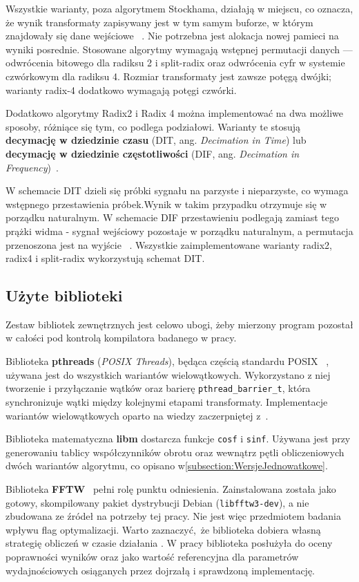 Wszystkie warianty, poza algorytmem Stockhama, działają w miejscu, co oznacza, że wynik transformaty zapisywany jest w tym
samym buforze, w którym znajdowały się dane wejściowe ~\cite{ZielinskiDSP}. Nie potrzebna jest alokacja nowej pamieci na wyniki posrednie. Stosowane algorytmy wymagają
wstępnej permutacji danych — odwrócenia bitowego dla radiksu 2 i split-radix
oraz odwrócenia cyfr w systemie czwórkowym dla radiksu 4. Rozmiar transformaty
jest zawsze potęgą dwójki; warianty radix-4 dodatkowo wymagają potęgi czwórki.

Dodatkowo algorytmy Radix2 i Radix 4 można implementować na dwa możliwe sposoby, różniące się tym, co
podlega podziałowi. Warianty te stosują \textbf{decymację w dziedzinie czasu}
(DIT, ang. \textit{Decimation in Time}) lub \textbf{decymację w dziedzinie
częstotliwości} (DIF, ang. \textit{Decimation in Frequency})~\cite{ZielinskiDSP}.

W schemacie DIT dzieli się próbki sygnału na parzyste
i nieparzyste, co wymaga wstępnego przestawienia próbek.Wynik w takim przypadku otrzymuje się w porządku naturalnym.
W schemacie DIF przestawieniu podlegają zamiast tego prążki widma - sygnał
wejściowy pozostaje w porządku naturalnym, a permutacja przenoszona jest na
wyjście ~\cite{ZielinskiDSP}.
Wszystkie zaimplementowane warianty radix2, radix4 i split-radix wykorzystują schemat DIT.
\subsection{Użyte biblioteki}
Zestaw bibliotek zewnętrznych jest celowo ubogi, żeby mierzony program pozostał w całości pod kontrolą kompilatora badanego w pracy.

Biblioteka \textbf{pthreads} (\emph{POSIX Threads}), będąca częścią standardu
POSIX ~\cite{POSIX_Threads}, używana jest do wszystkich wariantów wielowątkowych. Wykorzystano
z niej tworzenie i przyłączanie wątków oraz barierę \texttt{pthread\_barrier\_t},
która synchronizuje wątki między kolejnymi etapami transformaty. Implementacje
wariantów wielowątkowych oparto na wiedzy zaczerpniętej
z~\cite{POSIX_Threads}.

Biblioteka matematyczna \textbf{libm} dostarcza funkcje \texttt{cosf} i \texttt{sinf}.
Używana jest przy generowaniu tablicy współczynników obrotu oraz
wewnątrz pętli obliczeniowych dwóch wariantów algorytmu, co opisano
w\cref{subsection:WersjeJednowatkowe}.

Biblioteka \textbf{FFTW}~\cite{FFTWPaper} pełni rolę punktu odniesienia.
Zainstalowana została jako gotowy, skompilowany pakiet dystrybucji Debian
(\texttt{libfftw3-dev}), a nie zbudowana ze źródeł na potrzeby tej pracy. Nie
jest więc przedmiotem badania wpływu flag optymalizacji. Warto zaznaczyć, że 
biblioteka dobiera własną strategię obliczeń w czasie działania \cite{FFTWPaper}.
W pracy biblioteka posłużyła do oceny poprawności wyników oraz jako wartość
referencyjna dla parametrów wydajnościowych osiąganych przez dojrzałą
i sprawdzoną implementację.

